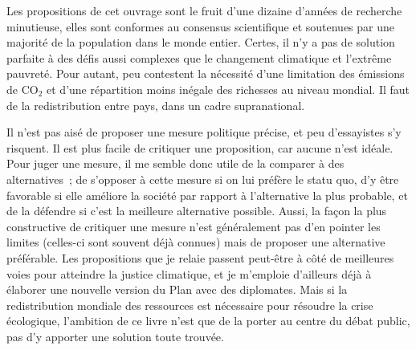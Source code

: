 \documentclass[a5paper,french,openany]{memoir}
\begin{document}
Les propositions de cet ouvrage sont le fruit d'une dizaine d'années de recherche minutieuse, elles sont conformes au consensus scientifique et soutenues par une majorité de la population dans le monde entier. 
Certes, il n'y a pas de solution parfaite à des défis aussi complexes que le changement climatique et l'extrême pauvreté. 
Pour autant, peu contestent la nécessité d'une limitation des émissions de CO$_\text{2}$ et d'une répartition moins inégale des richesses au niveau mondial. Il faut de la redistribution entre pays, dans un cadre supranational. 

Il n'est pas aisé de proposer une mesure politique précise, et peu d'essayistes s'y risquent. Il est plus facile de critiquer une proposition, car aucune n'est idéale. Pour juger une mesure, il me semble donc utile de la comparer à des alternatives~; de s'opposer à cette mesure si on lui préfère le statu quo, d'y être favorable si elle améliore la société par rapport à l'alternative la plus probable, et de la défendre si c'est la meilleure alternative possible. Aussi, la façon la plus constructive de critiquer une mesure n'est généralement pas d'en pointer les limites (celles-ci sont souvent déjà connues) mais de proposer une alternative préférable. 
Les propositions que je relaie %
passent peut-être à côté de meilleures voies pour atteindre la justice climatique, et je m'emploie d'ailleurs déjà à élaborer une nouvelle version du Plan avec des diplomates. %
Mais si la redistribution mondiale des ressources est nécessaire pour résoudre la crise écologique, l'ambition de ce livre n'est que de la porter au centre du débat public, %
pas d'y apporter une solution toute trouvée. 
\end{document}
